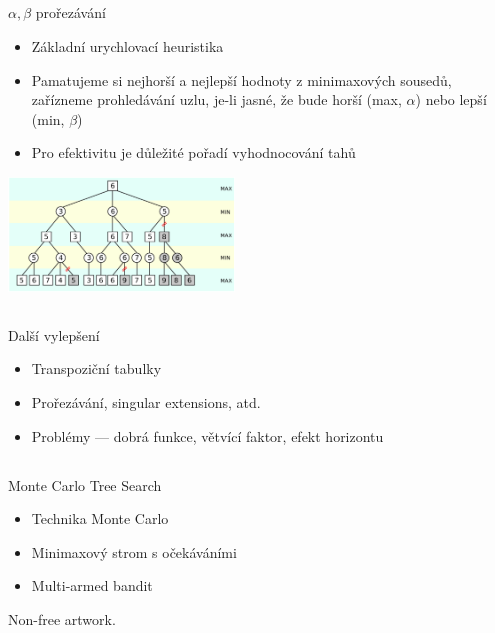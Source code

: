 \documentclass{beamer}
\begin{document}
\subsection{}
\begin{frame}{$\alpha,\beta$ prořezávání}
\begin{itemize}
\item Základní urychlovací heuristika
\item Pamatujeme si nejhorší a nejlepší hodnoty z minimaxových sousedů, zařízneme prohledávání uzlu, je-li jasné, že bude horší (max, $\alpha$) nebo lepší (min, $\beta$)
\item Pro efektivitu je důležité pořadí vyhodnocování tahů
\end{itemize}
\begin{center}
\includegraphics[width=6cm]{AB_pruning.pdf}
\end{center}
\end{frame}

\subsection{}
\begin{frame}{Další vylepšení}
\begin{itemize}
\item Transpoziční tabulky
\item Prořezávání, singular extensions, atd.
\item Problémy --- dobrá funkce, větvící faktor, efekt horizontu
\end{itemize}
\end{frame}

\subsection{}
\begin{frame}{Monte Carlo Tree Search}
\begin{itemize}
\item Technika Monte Carlo
\item Minimaxový strom s očekáváními
\item Multi-armed bandit
\end{itemize}
\begin{center}
Non-free artwork.
\end{center}
\end{frame}
\end{document}
